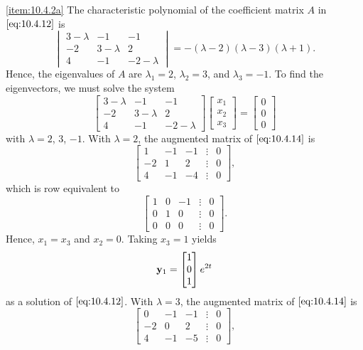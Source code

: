 \documentclass{ximera}
\begin{document}
\begin{example}
\begin{explanation}   
\ref{item:10.4.2a} The characteristic
polynomial of the  coefficient matrix $A$ in  $\eqref{eq:10.4.12}$ is
$$
\begin{vmatrix}3-\lambda&-1&-1\\-2&3-\lambda&
2\\4
&-1&-2-\lambda\end{vmatrix}=-(\lambda-2)(\lambda-3)(\lambda+1).
$$
Hence, the eigenvalues of $A$ are $\lambda_1=2$, $\lambda_2=3$,  and
$\lambda_3=-1$.
To find the  eigenvectors, we must solve the system
\begin{equation}\label{eq:10.4.14}
\begin{bmatrix}3-\lambda&-1&-1\\-2&3-\lambda&
2\\4&-1&
-2-\lambda\end{bmatrix}\begin{bmatrix} x_1\\x_2\\x_3
\end{bmatrix}=\begin{bmatrix}0\\0\\0\end{bmatrix}
\end{equation}
with $\lambda=2$, $3$, $-1$.  With $\lambda=2$, the augmented matrix of
$\eqref{eq:10.4.14}$ is
$$
\begin{bmatrix} 1&-1&-1&\vdots&0\\-2&
1&2&\vdots&0\\4&-1&-4&\vdots&0
\end{bmatrix},
$$
which is row equivalent to
$$
\begin{bmatrix} 1&0&-1&\vdots&0\\0&1&0&
\vdots&0\\0&0&0&\vdots&0\end{bmatrix}.
$$
Hence,  $x_1=x_3$ and $x_2=0$.  Taking $x_3=1$ yields
$$
{\bf y}_1=\begin{bmatrix}1\\0\\1\end{bmatrix}e^{2t}
$$
as a solution of  $\eqref{eq:10.4.12}$.  With $\lambda=3$, the augmented
matrix of  $\eqref{eq:10.4.14}$ is
$$
\begin{bmatrix}0&-1&-1&\vdots&0\\-2&
0& 2&\vdots&0\\4&-1&-5&\vdots&0
\end{bmatrix},
$$
\end{explanation}
\end{example}
\end{document}
